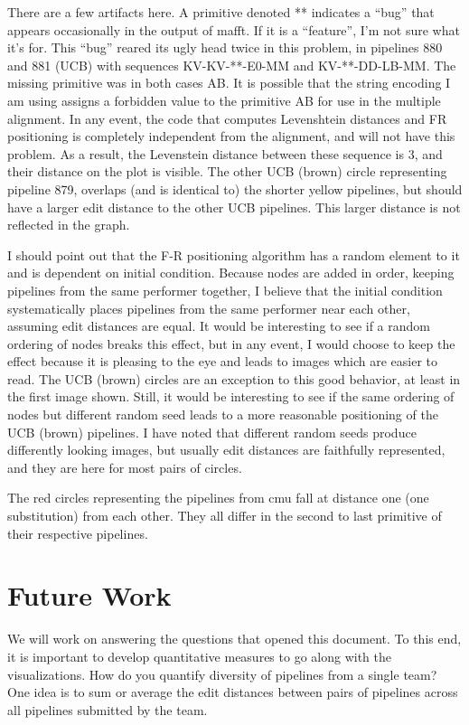 \documentclass{article}
\begin{document}
There are a few artifacts here.  A primitive denoted ** indicates a
``bug'' that appears occasionally in the output of mafft.  If it is a
``feature'', I'm not sure what it's for.  This ``bug'' reared its ugly
head twice in this problem, in pipelines 880 and 881 (UCB) with
sequences KV-KV-**-E0-MM and KV-**-DD-LB-MM.  The missing primitive
was in both cases AB.  It is possible that the string encoding I am
using assigns a forbidden value to the primitive AB for use in the
multiple alignment.  In any event, the code that computes Levenshtein
distances and FR positioning is completely independent from the
alignment, and will not have this problem.  As a result, the
Levenstein distance between these sequence is 3, and their distance on
the plot is visible.  The other UCB (brown) circle representing
pipeline 879, overlaps (and is identical to) the shorter yellow
pipelines, but should have a larger edit distance to the other UCB
pipelines.  This larger distance is not reflected in the graph.

I should point out that the F-R positioning algorithm has a random
element to it and is dependent on initial condition.  Because nodes
are added in order, keeping pipelines from the same performer
together, I believe that the initial condition systematically places
pipelines from the same performer near each other, assuming edit
distances are equal.  It would be interesting to see if a random
ordering of nodes breaks this effect, but in any event, I would choose
to keep the effect because it is pleasing to the eye and leads to
images which are easier to read.  The UCB (brown) circles are an
exception to this good behavior, at least in the first image shown.
Still, it would be interesting to see if the same ordering of nodes
but different random seed leads to a more reasonable positioning of
the UCB (brown) pipelines.  I have noted that different random seeds
produce differently looking images, but usually edit distances are
faithfully represented, and they are here for most pairs of circles.

The red circles representing the pipelines from cmu fall at distance
one (one substitution) from each other.  They all differ in the second
to last primitive of their respective pipelines.

\section{Future Work}

We will work on answering the questions that opened this document.  To
this end, it is important to develop quantitative measures to go along
with the visualizations.  How do you quantify diversity of pipelines
from a single team?  One idea is to sum or average the edit distances
between pairs of pipelines across all pipelines submitted by the team.
\end{document}
